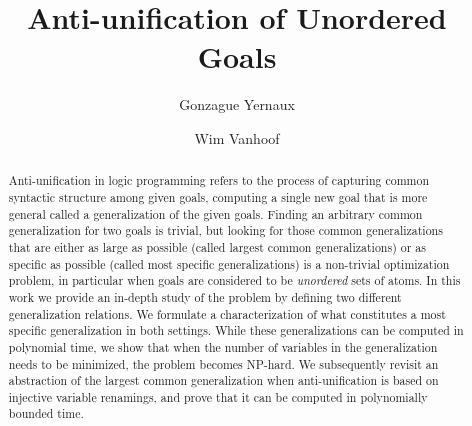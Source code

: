 \documentclass[a4paper,UKenglish,cleveref, autoref, thm-restate]{lipics-v2021}
\title{Anti-unification of Unordered Goals}
\author{Gonzague Yernaux}{University of Namur - Faculty of Computer Science (Belgium)\\Namur Digital Institute}{gonzague.yernaux@unamur.be}{https://orcid.org/0000-0001-6430-8168}{}
\author{Wim Vanhoof}{University of Namur - Faculty of Computer Science (Belgium)\\Namur Digital Institute}{wim.vanhoof@unamur.be}{https://orcid.org/0000-0003-3769-6294}{}
\begin{document}
   

	\maketitle 
	\begin{abstract}
		Anti-unification in logic programming refers to the process of capturing common syntactic structure among given goals, computing a single new goal that is more general called a generalization of the given goals. Finding an arbitrary common generalization for two goals is trivial, but looking for those common generalizations that are either as large as possible (called largest common generalizations) or as specific as possible (called most specific generalizations) is a non-trivial optimization problem, in particular when goals are considered to be \textit{unordered} sets of atoms. In this work we provide an in-depth study of the problem by defining two different generalization relations. We formulate a characterization of what constitutes a most specific generalization in both settings. While these generalizations can be computed in polynomial time, we show that when the number of variables in the generalization needs to be minimized, the problem becomes NP-hard. We subsequently revisit an abstraction of the largest common generalization when anti-unification is based on injective variable renamings, and prove that it can be computed in polynomially bounded time. 
	\end{abstract}


	

	
	
	
	
	
	
	
	
	
\end{document}
